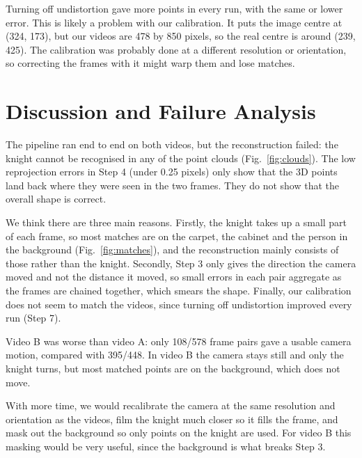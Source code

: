 \documentclass[conference]{assets/latex/IEEEtran}
\begin{document}
Turning off undistortion gave more points in every run, with the same or lower error. This is likely a problem with our calibration. It puts the image centre at (324, 173), but our videos are 478 by 850 pixels, so the real centre is around (239, 425). The calibration was probably done at a different resolution or orientation, so correcting the frames with it might warp them and lose matches.

\section{Discussion and Failure Analysis}
The pipeline ran end to end on both videos, but the reconstruction failed: the knight cannot be recognised in any of the point clouds (Fig.~\ref{fig:clouds}). The low reprojection errors in Step 4 (under 0.25 pixels) only show that the 3D points land back where they were seen in the two frames. They do not show that the overall shape is correct.

We think there are three main reasons. Firstly, the knight takes up a small part of each frame, so most matches are on the carpet, the cabinet and the person in the background (Fig.~\ref{fig:matches}), and the reconstruction mainly consists of those rather than the knight. Secondly, Step 3 only gives the direction the camera moved and not the distance it moved, so small errors in each pair aggregate as the frames are chained together, which smears the shape. Finally, our calibration does not seem to match the videos, since turning off undistortion improved every run (Step 7).

Video B was worse than video A: only 108/578 frame pairs gave a usable camera motion, compared with 395/448. In video B the camera stays still and only the knight turns, but most matched points are on the background, which does not move.

With more time, we would recalibrate the camera at the same resolution and orientation as the videos, film the knight much closer so it fills the frame, and mask out the background so only points on the knight are used. For video B this masking would be very useful, since the background is what breaks Step 3.
\end{document}
